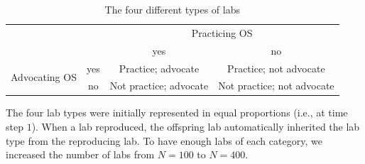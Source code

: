 \documentclass[meta, authordate,issue]{jote-new-article}
\begin{document}
%
%
\begin{table}[]
  \centering
  \begin{fullwidth}

    \centering
    \caption{The four different types of labs}
    \label{tab:labtypes}
    \begin{tabular}{c c | c c}
                                     &     & \multicolumn{2}{c}{Practicing OS}                              \\
                                     &     & yes                               & no                         \\
      \hline
      \multirow{2}{*}{Advocating OS} & yes & Practice; advocate                & Practice; not advocate     \\
                                     & no  & Not practice; advocate            & Not practice; not advocate \\
    \end{tabular}
  \end{fullwidth}
\end{table}
%

The four lab types were initially represented in equal proportions (i.e., at time step $1$). When a lab reproduced, the offspring lab automatically inherited the lab type from the reproducing lab. To have enough labs of each category, we increased the number of labs from $N=100$ to $N=400$.
\end{document}
